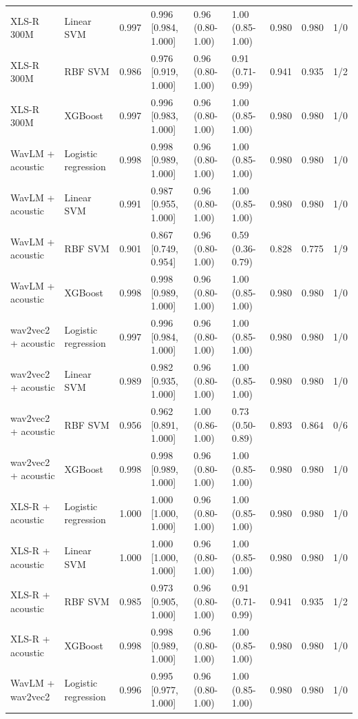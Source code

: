 \documentclass[10pt,a4paper]{article}
\begin{document}
\begin{center}
\begin{longtable}{p{3.0cm}p{2.0cm}rlllrrl}
XLS-R 300M & Linear SVM & 0.997 & 0.996 [0.984, 1.000] & 0.96 (0.80-1.00) & 1.00 (0.85-1.00) & 0.980 & 0.980 & 1/0\\
XLS-R 300M & RBF SVM & 0.986 & 0.976 [0.919, 1.000] & 0.96 (0.80-1.00) & 0.91 (0.71-0.99) & 0.941 & 0.935 & 1/2\\
XLS-R 300M & XGBoost & 0.997 & 0.996 [0.983, 1.000] & 0.96 (0.80-1.00) & 1.00 (0.85-1.00) & 0.980 & 0.980 & 1/0\\
WavLM + acoustic & Logistic regression & 0.998 & 0.998 [0.989, 1.000] & 0.96 (0.80-1.00) & 1.00 (0.85-1.00) & 0.980 & 0.980 & 1/0\\
WavLM + acoustic & Linear SVM & 0.991 & 0.987 [0.955, 1.000] & 0.96 (0.80-1.00) & 1.00 (0.85-1.00) & 0.980 & 0.980 & 1/0\\
WavLM + acoustic & RBF SVM & 0.901 & 0.867 [0.749, 0.954] & 0.96 (0.80-1.00) & 0.59 (0.36-0.79) & 0.828 & 0.775 & 1/9\\
WavLM + acoustic & XGBoost & 0.998 & 0.998 [0.989, 1.000] & 0.96 (0.80-1.00) & 1.00 (0.85-1.00) & 0.980 & 0.980 & 1/0\\
wav2vec2 + acoustic & Logistic regression & 0.997 & 0.996 [0.984, 1.000] & 0.96 (0.80-1.00) & 1.00 (0.85-1.00) & 0.980 & 0.980 & 1/0\\
wav2vec2 + acoustic & Linear SVM & 0.989 & 0.982 [0.935, 1.000] & 0.96 (0.80-1.00) & 1.00 (0.85-1.00) & 0.980 & 0.980 & 1/0\\
wav2vec2 + acoustic & RBF SVM & 0.956 & 0.962 [0.891, 1.000] & 1.00 (0.86-1.00) & 0.73 (0.50-0.89) & 0.893 & 0.864 & 0/6\\
wav2vec2 + acoustic & XGBoost & 0.998 & 0.998 [0.989, 1.000] & 0.96 (0.80-1.00) & 1.00 (0.85-1.00) & 0.980 & 0.980 & 1/0\\
XLS-R + acoustic & Logistic regression & 1.000 & 1.000 [1.000, 1.000] & 0.96 (0.80-1.00) & 1.00 (0.85-1.00) & 0.980 & 0.980 & 1/0\\
XLS-R + acoustic & Linear SVM & 1.000 & 1.000 [1.000, 1.000] & 0.96 (0.80-1.00) & 1.00 (0.85-1.00) & 0.980 & 0.980 & 1/0\\
XLS-R + acoustic & RBF SVM & 0.985 & 0.973 [0.905, 1.000] & 0.96 (0.80-1.00) & 0.91 (0.71-0.99) & 0.941 & 0.935 & 1/2\\
XLS-R + acoustic & XGBoost & 0.998 & 0.998 [0.989, 1.000] & 0.96 (0.80-1.00) & 1.00 (0.85-1.00) & 0.980 & 0.980 & 1/0\\
WavLM + wav2vec2 & Logistic regression & 0.996 & 0.995 [0.977, 1.000] & 0.96 (0.80-1.00) & 1.00 (0.85-1.00) & 0.980 & 0.980 & 1/0\\

\end{longtable}
\end{center}
\end{document}
